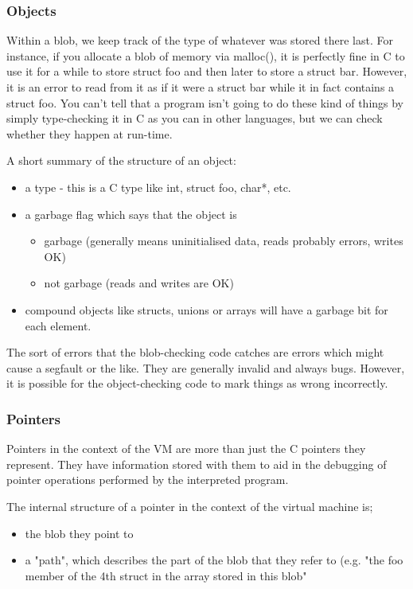 \documentclass[a4paper]{report}
\begin{document}
\subsubsection{Objects}
Within a blob, we keep track of the type of whatever was stored there last. For instance, if you allocate a blob of memory via malloc(), it is perfectly fine in C to use it for a while to store struct foo and then later to store a struct bar. However, it is an error to read from it as if it were a struct bar while it in fact contains a struct foo. You can't tell that a program isn't going to do these kind of things by simply type-checking it in C as you can in other languages, but we can check whether they happen at run-time. 
\par
A short summary of the structure of an object:
\begin{itemize}
\item a type - this is a C type like int, struct foo, char*, etc. 
\item a garbage flag which says that the object is
  \begin{itemize}
  \item garbage (generally means uninitialised data, reads probably errors, writes OK) 
  \item not garbage (reads and writes are OK) 
  \end{itemize}
\item compound objects like structs, unions or arrays will have a garbage bit for each element. 
\end{itemize}
The sort of errors that the blob-checking code catches are errors which might cause a segfault or the like. They are generally invalid and always bugs. However, it is possible for the object-checking code to mark things as wrong incorrectly.
\par
\subsubsection{Pointers}
Pointers in the context of the VM are more than just the C pointers they represent. They have information stored with them to aid in the debugging of pointer operations performed by the interpreted program.
\par
The internal structure of a pointer in the context of the virtual machine is;
\begin{itemize}
\item the blob they point to 
\item a "path", which describes the part of the blob that they refer to (e.g. "the foo member of the 4th struct in the array stored in this blob"
\end{itemize}
\end{document}
